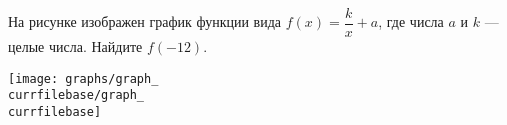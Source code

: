 \begin{ex}
	\begin{condition}
		\begin{minipage}[t]{0.67\textwidth}
			На рисунке изображен график функции вида \( f(x)=\dfrac{k}{x}+a \), где числа \( a \) и \( k \) --- целые числа. Найдите \( f(-12) \).
		\end{minipage}
		\begin{minipage}[c]{0.25\textwidth}
			\texttt{[image: graphs/graph\_\\currfilebase/graph\_\\currfilebase]}
		\end{minipage}
	\end{condition}
\end{ex}